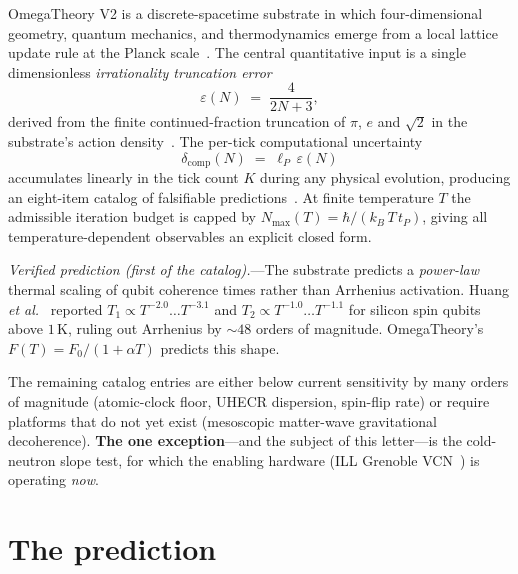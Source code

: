 \documentclass[aps,prl,twocolumn,superscriptaddress,nofootinbib,10pt]{revtex4-2}
\newcommand{\lP}{\ell_P}
\newcommand{\tP}{t_P}
\newcommand{\eps}{\varepsilon}
\newcommand{\dcomp}{\delta_{\mathrm{comp}}}
\newcommand{\Nmax}{N_{\max}}
\begin{document}
OmegaTheory V2 is a discrete-spacetime substrate in which
four-dimensional geometry, quantum mechanics, and thermodynamics
emerge from a local lattice update rule at the Planck
scale~\cite{Marchewka2026Main}. The central quantitative input is a
single dimensionless \emph{irrationality truncation error}
\begin{equation}
  \eps(N) \;=\; \frac{4}{2N+3},
\end{equation}
derived from the finite continued-fraction truncation of $\pi$, $e$
and $\sqrt{2}$ in the substrate's action
density~\cite{Marchewka2026AppK}. The per-tick computational
uncertainty
\begin{equation}
  \dcomp(N) \;=\; \lP\,\eps(N)
\end{equation}
accumulates linearly in the tick count $K$ during any physical
evolution, producing an eight-item catalog of falsifiable
predictions~\cite{Marchewka2026AppJ}. At finite temperature $T$ the
admissible iteration budget is capped by
$\Nmax(T) = \hbar/(k_B\,T\,\tP)$, giving all temperature-dependent
observables an explicit closed form.

\textit{Verified prediction (first of the catalog).}---The substrate
predicts a \emph{power-law} thermal scaling of qubit coherence times
rather than Arrhenius activation.  Huang \emph{et al.}~\cite{Huang2024Diraq}
reported $T_1 \propto T^{-2.0}\ldots T^{-3.1}$ and $T_2 \propto T^{-1.0}\ldots T^{-1.1}$
for silicon spin qubits above $1\,$K, ruling out Arrhenius by
$\sim 48$ orders of magnitude. OmegaTheory's $F(T) = F_0/(1+\alpha T)$
predicts this shape.

The remaining catalog entries are either below current sensitivity by
many orders of magnitude (atomic-clock floor, UHECR dispersion,
spin-flip rate) or require platforms that do not yet exist
(mesoscopic matter-wave gravitational decoherence).
\textbf{The one exception}---and the subject of this letter---is the
cold-neutron slope test, for which the enabling hardware (ILL Grenoble
VCN~\cite{Ackermann2026VCN}) is operating \emph{now}.

\section{The prediction}
\end{document}
